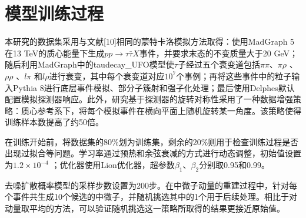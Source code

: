 \section{模型训练过程}
\label{sec:threepfive}

本研究的数据集采用与文献[10]相同的蒙特卡洛模拟方法取得：使用MadGraph 5\cite{ref22}在13 TeV的质心能量下生成$pp \to \tau \bar{\tau} X$事件，并要求末态的不变质量大于20 GeV；随后利用MadGraph中的taudecay\_UFO模型使$\tau $子经过五个衰变道包括$\pi \pi $、$\pi \rho$ 、$\rho \rho$ 、$l \pi$ 和$l \rho$进行衰变，其中每个衰变道对应$\mathrm{10^7}$个事例；再将这些事件中的粒子输入Pythia 8\cite{ref23}进行底层事件模拟、部分子簇射和强子化处理；最后使用Delphes\cite{ref24}默认配置模拟探测器响应。此外，研究基于探测器的旋转对称性采用了一种数据增强策略：质心参考系下，将每个模拟事件在横向平面上随机旋转某一角度。该策略使得训练样本数提高了约50倍。

在训练开始前，将数据集的80\%划为训练集，剩余的20\%则用于检查训练过程是否出现过拟合等问题。学习率通过预热和余弦衰减的方式进行动态调整，初始值设置为$\mathrm{1.2\times 10^{-4}}$ ；优化器使用Lion优化器，超参数$\beta_1$、$\beta_2$分别取0.95和0.99。

去噪扩散概率模型的采样步数设置为200步。在中微子动量的重建过程中，针对每个事件共生成10个候选的中微子，并随机挑选其中的1个用于后续处理。相比于对动量取平均的方法，可以验证随机挑选这一策略所取得的结果更接近原始值。